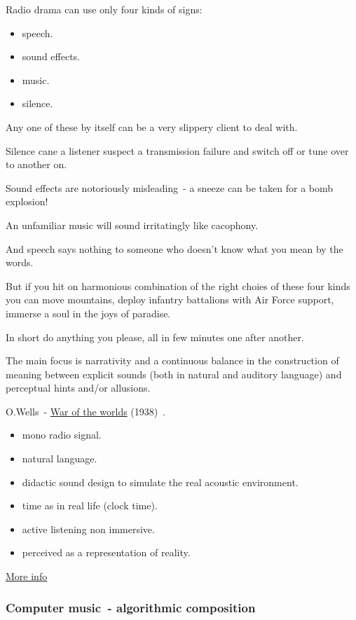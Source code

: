 Radio drama can use only four kinds of signs:

\begin{itemize}
\tightlist\item speech.
\item sound effects.
\item music.
\item silence.
\end{itemize}

Any one of these by itself can be a very slippery client to deal with.

Silence cane a listener suspect a transmission failure and switch off or tune over to another on.

Sound effects are notoriously misleading~- a sneeze can be taken for a bomb explosion!

An unfamiliar music will sound irritatingly like cacophony.

And speech says nothing to someone who doesn't know what you mean by the words.

But if you hit on harmonious combination of the right choies of these four kinds you can move mountains, deploy infantry battalions with Air Force support, immerse a soul in the joys of paradise.

In short do anything you please, all in few minutes one after another.

The main focus is narrativity and a continuous balance in the construction of meaning between explicit sounds (both in natural and auditory language) and perceptual hints and/or allusions.

O.Wells~- \href{http://www.musicaecodice.it/on_server/media/2_media/wells.mp3}{War of the worlds} (1938)~\cite{wells}.

\begin{itemize}
\tightlist\item mono radio signal.
\item natural language.
\item didactic sound design to simulate the real acoustic environment.
\item time as in real life (clock time).
\item active listening non immersive.
\item perceived as a representation of reality.
\end{itemize}

\href{http://www.musicaecodice.it/on_server/media/2_media/radio.pdf}{More info}

\subsubsection{Computer music~- algorithmic composition}\label{computer-music---algorithmic-composition}

